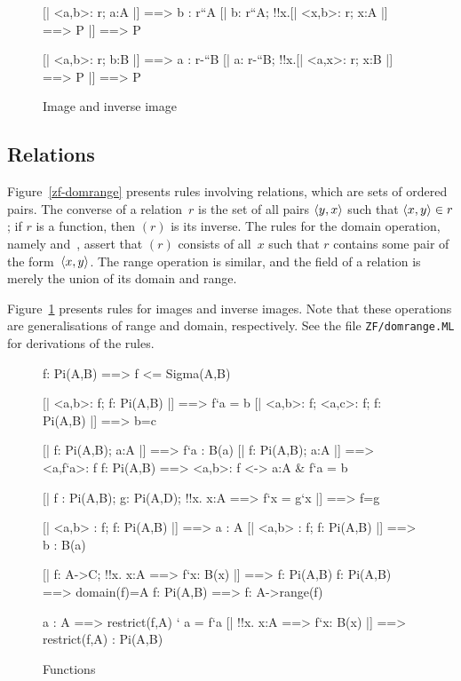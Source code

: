 \begin{figure}
\begin{ttbox}
         [| <a,b>: r;  a:A |] ==> b : r``A
         [| b: r``A;  !!x.[| <x,b>: r;  x:A |] ==> P |] ==> P

        [| <a,b>: r;  b:B |] ==> a : r-``B
        [| a: r-``B;  !!x.[| <a,x>: r;  x:B |] ==> P |] ==> P
\end{ttbox}
\caption{Image and inverse image} \label{zf-domrange2}
\end{figure}


\subsection{Relations}
Figure~\ref{zf-domrange} presents rules involving relations, which are sets
of ordered pairs.  The converse of a relation~$r$ is the set of all pairs
$\langle y,x\rangle$ such that $\langle x,y\rangle\in r$; if $r$ is a function, then
{$(r)$} is its inverse.  The rules for the domain
operation, namely  and~, assert that
$(r)$ consists of all~$x$ such that $r$ contains
some pair of the form~$\langle x,y\rangle$.  The range operation is similar, and
the field of a relation is merely the union of its domain and range.  

Figure~\ref{zf-domrange2} presents rules for images and inverse images.
Note that these operations are generalisations of range and domain,
respectively.  See the file {\tt ZF/domrange.ML} for derivations of the
rules.



\begin{figure}
\begin{ttbox}
      f: Pi(A,B) ==> f <= Sigma(A,B)

  [| <a,b>: f;  f: Pi(A,B) |] ==> f`a = b
 [| <a,b>: f;  <a,c>: f;  f: Pi(A,B) |] ==> b=c

      [| f: Pi(A,B);  a:A |] ==> f`a : B(a)
      [| f: Pi(A,B);  a:A |] ==> <a,f`a>: f
       f: Pi(A,B) ==> <a,b>: f <-> a:A & f`a = b

   [| f : Pi(A,B);  g: Pi(A,D);
                   !!x. x:A ==> f`x = g`x     |] ==> f=g

     [| <a,b> : f;  f: Pi(A,B) |] ==> a : A
      [| <a,b> : f;  f: Pi(A,B) |] ==> b : B(a)

         [| f: A->C;  !!x. x:A ==> f`x: B(x) |] ==> f: Pi(A,B)
   f: Pi(A,B) ==> domain(f)=A
    f: Pi(A,B) ==> f: A->range(f)

        a : A ==> restrict(f,A) ` a = f`a
   [| !!x. x:A ==> f`x: B(x) |] ==> 
                restrict(f,A) : Pi(A,B)
\end{ttbox}
\caption{Functions} \label{zf-func1}
\end{figure}


